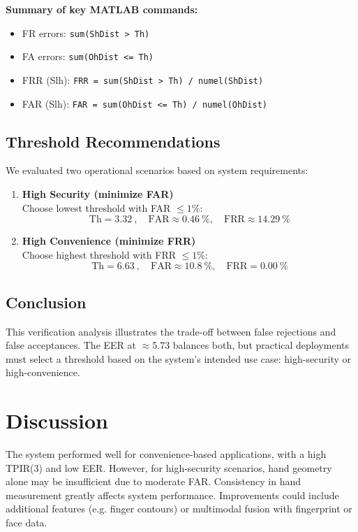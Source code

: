 \documentclass[a4paper,11pt]{article}
\begin{document}
\noindent\textbf{Summary of key MATLAB commands:}
\begin{itemize}
    \item FR errors: \texttt{sum(ShDist > Th)}
    \item FA errors: \texttt{sum(OhDist <= Th)}
    \item FRR (Slh): \texttt{FRR = sum(ShDist > Th) / numel(ShDist)}
    \item FAR (Slh): \texttt{FAR = sum(OhDist <= Th) / numel(OhDist)}
\end{itemize}

\subsection{Threshold Recommendations}

We evaluated two operational scenarios based on system requirements:

\begin{enumerate}[label=\textbf{\arabic*)}, itemsep=0.8em]
    \item \textbf{High Security (minimize FAR)} \\
    \quad Choose lowest threshold with FAR $\leq 1\%$:
    \[
    \text{Th} = \SI{3.32}{}, \quad \text{FAR} \approx \SI{0.46}{\percent}, \quad \text{FRR} \approx \SI{14.29}{\percent}
    \]

    \item \textbf{High Convenience (minimize FRR)} \\
    \quad Choose highest threshold with FRR $\leq 1\%$:
    \[
    \text{Th} = \SI{6.63}{}, \quad \text{FAR} \approx \SI{10.8}{\percent}, \quad \text{FRR} = \SI{0.00}{\percent}
    \]
\end{enumerate}

\subsection{Conclusion}

This verification analysis illustrates the trade-off between false rejections and false acceptances. The EER at $\approx$5.73 balances both, but practical deployments must select a threshold based on the system's intended use case: high-security or high-convenience.

\section{Discussion}
The system performed well for convenience-based applications, with a high TPIR(3) and low EER. However, for high-security scenarios, hand geometry alone may be insufficient due to moderate FAR. Consistency in hand measurement greatly affects system performance. Improvements could include additional features (e.g. finger contours) or multimodal fusion with fingerprint or face data.
\end{document}
